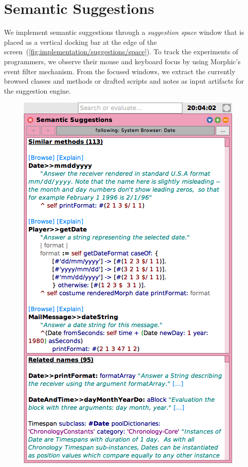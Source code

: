 
\section{Semantic Suggestions}
\label{sec:implementation/suggestions}

We implement semantic suggestions through a \emph{suggestion space} window that is placed as a vertical docking bar at the edge of the screen~(\cref{fig:implementation/suggestions/space}).
To track the experiments of programmers, we observe their mouse and keyboard focus by using Morphic's event filter mechanism.
From the focused windows, we extract the currently browsed classes and methods or drafted scripts and notes as input artifacts for the suggestion engine.

\begin{figure}
	\centering
	\includegraphics[height=30\baselineskip]{01_suggestions/space.png} %

\end{figure}
